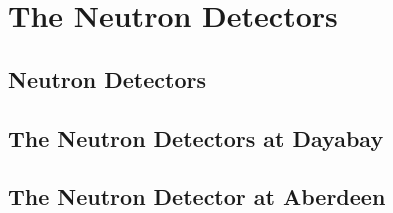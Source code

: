 
\chapter{The Neutron Detectors}

\section{Neutron Detectors}

\section{The Neutron Detectors at Dayabay}

\section{The Neutron Detector at Aberdeen}
